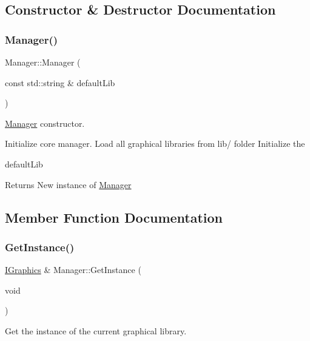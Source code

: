 \subsection{Constructor \& Destructor Documentation}
\mbox{\label{class_manager_a72554004e4ab55571d9907455de28656}} 
\subsubsection{\texorpdfstring{Manager()}{Manager()}}
{\footnotesize\ttfamily Manager\+::\+Manager (\begin{DoxyParamCaption}\item[{const std\+::string \&}]{default\+Lib }\end{DoxyParamCaption})}



\hyperlink{class_manager}{Manager} constructor. 

Initialize core manager. Load all graphical libraries from lib/ folder Initialize the \begin{DoxyParagraph}{default\+Lib}

\end{DoxyParagraph}
\begin{DoxyReturn}{Returns}
New instance of \hyperlink{class_manager}{Manager} 
\end{DoxyReturn}


\subsection{Member Function Documentation}
\mbox{\label{class_manager_a8cb265f0bd19351a88df4c167ece1377}} 
\subsubsection{\texorpdfstring{Get\+Instance()}{GetInstance()}}
{\footnotesize\ttfamily \hyperlink{class_i_graphics}{I\+Graphics} \& Manager\+::\+Get\+Instance (\begin{DoxyParamCaption}\item[{void}]{ }\end{DoxyParamCaption})}



Get the instance of the current graphical library. 

